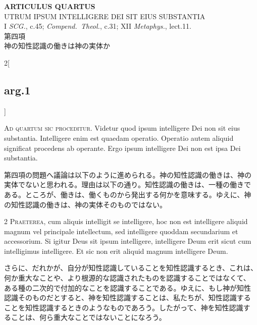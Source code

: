 \documentclass[paper=a4paper,fontsize=10pt,jafontsize=9pt,titlepage]{jlreq}
\begin{document}
\newpage


{}
\setcounter{section}{4}
\setcounter{subsection}{0}
\begin{center}
{\Large {\bfseries ARTICULUS QUARTUS}}\\ {\large UTRUM IPSUM INTELLIGERE DEI
SIT EIUS SUBSTANTIA}\\ {\footnotesize I {\itshape SCG.}, c.45;
{\itshape Compend.~Theol.}, c.31; XII {\itshape Metaphys.},
lect.11.}\\ {\Large 第四項\\神の知性認識の働きは神の実体か}
\end{center}



\begin{paracol}{2}[\subsection{arg.1}]

{\huge A}{\scshape d quartum sic proceditur}. Videtur quod ipsum
intelligere Dei non sit eius substantia. Intelligere enim est quaedam
operatio. Operatio autem aliquid significat procedens ab
operante. Ergo ipsum intelligere Dei non est ipsa Dei substantia.

\switchcolumn

第四項の問題へ議論は以下のように進められる。神の知性認識の働きは、神の
実体でないと思われる。理由は以下の通り。知性認識の働きは、一種の働きで
ある。ところが、働きは、働くものから発出する何かを意味する。ゆえに、神
の知性認識の働きは、神の実体そのものではない。


{\scshape 2 Praeterea}, cum aliquis intelligit se intelligere, hoc non
est intelligere aliquid magnum vel principale intellectum, sed
intelligere quoddam secundarium et accessorium. Si igitur Deus sit
ipsum intelligere, intelligere Deum erit sicut cum intelligimus
intelligere. Et sic non erit aliquid magnum intelligere Deum.

\switchcolumn

さらに、だれかが、自分が知性認識していることを知性認識するとき、これは、
何か重大なことや、より根源的な認識されたものを認識することではなくて、
ある種の二次的で付加的なことを認識することである。ゆえに、もし神が知性
認識そのものだとすると、神を知性認識することは、私たちが、知性認識する
ことを知性認識するときのようなものであろう。したがって、神を知性認識す
ることは、何ら重大なことではないことになろう。


\end{paracol}
\end{document}
